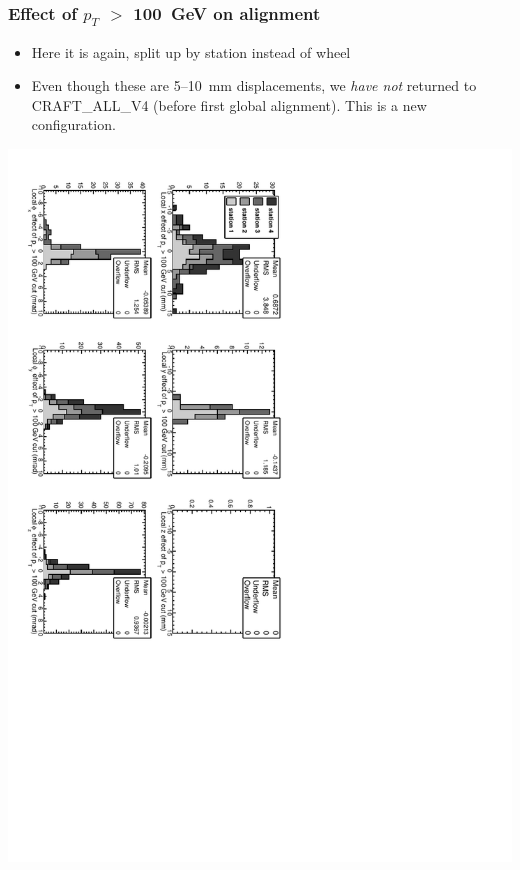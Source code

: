 \documentclass[compress]{beamer}
\begin{document}
\begin{frame}
\frametitle{Effect of $p_T$ $>$ 100~GeV on alignment}

\begin{itemize}
\item Here it is again, split up by station instead of wheel
\item Even though these are 5--10~mm displacements, we {\it have not}
  returned to CRAFT\_ALL\_V4 (before first global alignment).  This is a new configuration.
\end{itemize}

\vfill
\includegraphics[height=\linewidth, angle=90]{data_effect_of_100GeVcut2.pdf}
\end{frame}
\end{document}
